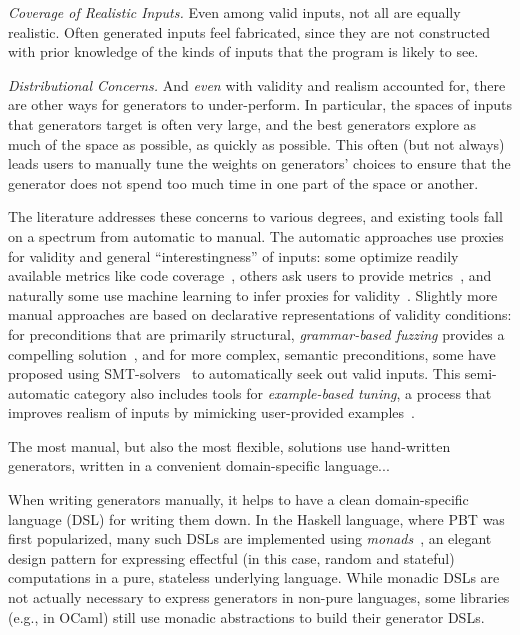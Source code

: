 {\em Coverage of Realistic Inputs.}
Even among valid inputs, not all are equally realistic. Often generated inputs
feel fabricated, since they are not constructed with prior knowledge of the
kinds of inputs that the program is likely to see.

{\em Distributional Concerns.}
And {\em even} with validity and realism accounted for, there are other ways for
generators to under-perform. In particular, the spaces of inputs that generators
target is often very large, and the best generators explore as much of the space
as possible, as quickly as possible. This often (but not always) leads users to manually tune
the weights on generators' choices to ensure that the generator does not spend
too much time in one part of the space or another.


The literature addresses these concerns to various degrees, and existing tools
fall on a spectrum from automatic to manual. The automatic approaches use
proxies for validity and general ``interestingness'' of inputs: some optimize
readily available metrics like code coverage~\cite{afl-readme}, others ask users
to provide metrics~\cite{loscher2017targetedpbt}, and naturally some use
machine learning to infer proxies for validity~\cite{godefroid2017learn,
DBLP:conf/icse/ReddyLPS20}. Slightly more manual approaches are based on
declarative representations of validity conditions: for preconditions that are
primarily structural, {\em grammar-based fuzzing} provides a compelling
solution~\cite{godefroid2008grammar, holler2012fuzzing, veggalam2016ifuzzer,
wang2019superion, srivastava2021gramatron}, and for more complex, semantic
preconditions, some have proposed using SMT-solvers~\cite{dewey2017automated, LuckPOPL, steinhofel2022input} to
automatically seek out valid inputs. This semi-automatic category also includes
tools for {\em example-based tuning}, a process that improves realism of inputs
by mimicking user-provided examples~\cite{soremekun2020inputs}.

The most manual, but also the most flexible, solutions use hand-written
generators, written in a convenient domain-specific language...

When writing generators manually, it helps to have a clean domain-specific
language (DSL) for writing them down. In the Haskell language, where PBT was
first popularized, many such DSLs are implemented using {\em
monads\/}~\cite{moggi1991notions}, an elegant design pattern for
expressing effectful (in this case, random and stateful) computations
in a pure, stateless underlying
language. While monadic DSLs are not actually necessary to express generators in
non-pure languages, some libraries (e.g., in OCaml) still use monadic
abstractions to build their generator DSLs.

